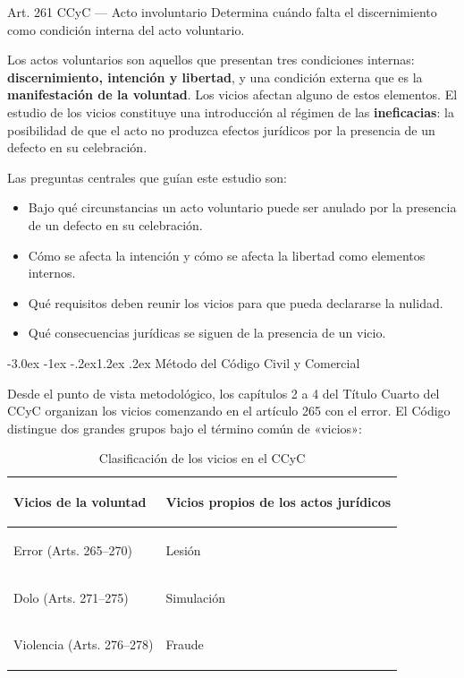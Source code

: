 \documentclass[12pt,oneside]{book}
\makeatletter
\renewcommand\section{\@startsection{section}{1}{\z@}%
  {-3.0ex \@plus -1ex \@minus -.2ex}{1.2ex \@plus .2ex}%
  {\normalfont\large\bfseries\color{acento}}}
\makeatother
\begin{document}
\begin{articulo}{Art. 261 CCyC --- Acto involuntario}
Determina cuándo falta el discernimiento como condición interna del acto voluntario.
\end{articulo}

Los actos voluntarios son aquellos que presentan tres condiciones internas: \textbf{discernimiento, intención y libertad}, y una condición externa que es la \textbf{manifestación de la voluntad}. Los vicios afectan alguno de estos elementos. El estudio de los vicios constituye una introducción al régimen de las \textbf{ineficacias}: la posibilidad de que el acto no produzca efectos jurídicos por la presencia de un defecto en su celebración.

Las preguntas centrales que guían este estudio son:
\begin{itemize}
    \item Bajo qué circunstancias un acto voluntario puede ser anulado por la presencia de un defecto en su celebración.
    \item Cómo se afecta la intención y cómo se afecta la libertad como elementos internos.
    \item Qué requisitos deben reunir los vicios para que pueda declararse la nulidad.
    \item Qué consecuencias jurídicas se siguen de la presencia de un vicio.
\end{itemize}

\section{Método del Código Civil y Comercial}

Desde el punto de vista metodológico, los capítulos 2 a 4 del Título Cuarto del CCyC organizan los vicios comenzando en el artículo 265 con el error. El Código distingue dos grandes grupos bajo el término común de «vicios»:

\begin{table}[H]
\centering
\begin{tabularx}{\textwidth}{>{\bfseries\raggedright\arraybackslash}X >{\raggedright\arraybackslash}X}
\toprule
\textbf{Vicios de la voluntad} & \textbf{Vicios propios de los actos jurídicos} \\
\midrule
Error (Arts. 265--270) & Lesión \\
Dolo (Arts. 271--275) & Simulación \\
Violencia (Arts. 276--278) & Fraude \\
\bottomrule
\end{tabularx}
\caption{Clasificación de los vicios en el CCyC}
\end{table}
\end{document}
